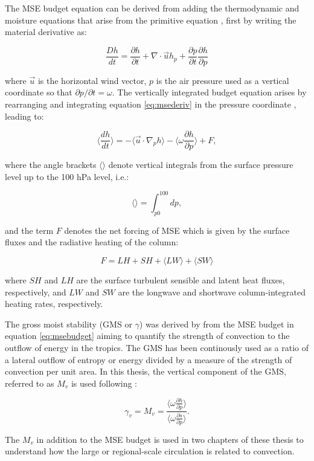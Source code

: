 The MSE budget equation can be derived from adding the thermodynamic and moisture equations that arise from the primitive equation \citep{neelin2005}, first by writing the material derivative as:

\begin{equation}
\frac{Dh}{dt}=\frac{\partial h}{\partial t}+\nabla\cdot{\vec{u}h}_p+\frac{\partial p}{\partial t}\frac{\partial h}{\partial p}
\label{eq:msederiv}
\end{equation}

\noindent where $\vec{u}$ is the horizontal wind vector, $p$ is the air pressure used as a vertical coordinate so that $\partial p/\partial t = \omega$. 
The vertically integrated budget equation arises by rearranging and integrating equation \ref{eq:msederiv} in the pressure coordinate \citep{back2006,inoue2015,annamalai2020}, leading to:

\begin{equation}
\Bigg\langle \frac{d h}{dt} \Bigg\rangle=-\Bigg\langle \vec{u}\cdot\nabla _p h  \Bigg\rangle -\Bigg\langle \omega\frac{\partial h}{\partial p}\Bigg\rangle + F,
\label{eq:msebudget}
\end{equation}

\noindent where the angle brackets $\langle \rangle$ denote vertical integrals from the surface pressure level up to the 100 hPa level, i.e.:

\begin{equation}
\Bigg\langle \Bigg\rangle= \int_{p0}^{100} dp, 
\end{equation}

\noindent and the term $F$ denotes the net forcing of MSE which is given by the surface fluxes and the radiative heating of the column:

\begin{equation}
F= LH+SH+\langle LW \rangle + \langle  SW \rangle
\end{equation}

\noindent where $SH$ and $LH$ are the surface turbulent sensible and latent heat fluxes, respectively, and $LW$ and $SW$ are the longwave and shortwave column-integrated heating rates, respectively.


The gross moist stability (GMS or $\gamma$) was derived by \cite{neelin1987modeling} from the MSE budget in equation \ref{eq:msebudget} aiming to quantify the strength of convection to the outflow of energy in the tropics. The GMS has been continously used \citep{raymond2009,inoue2015,nie2015,inoue2021} as a ratio of a lateral outflow of entropy or energy divided by a measure of the strength of convection per unit area. 
In this thesis, the vertical component of the GMS, referred to as $M_v$ is used following \citep{inoue2015}:

\begin{equation}
\gamma_v=M_v= \frac{\Bigg\langle \omega\frac{\partial h}{\partial p} \Bigg\rangle}{ \Bigg\langle \omega\frac{\partial s}{\partial p} \Bigg\rangle}.
\label{eq:ngms}
\end{equation}

The $M_v$ in addition to the MSE budget is used in two chapters of these thesis to understand how the large or regional-scale circulation is related to convection. 
